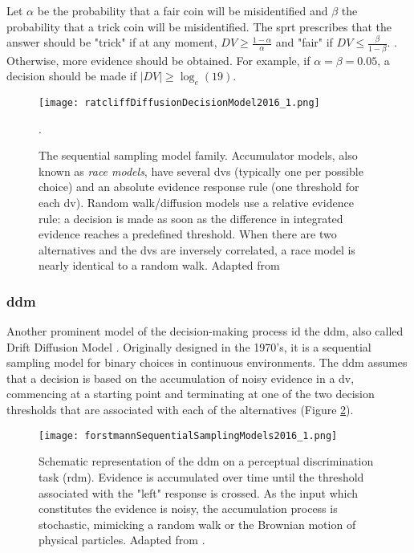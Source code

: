 Let $\alpha$ be the probability that a fair coin will be misidentified and $\beta$ the probability that a trick coin will be misidentified. The \acrshort{sprt} prescribes that the answer should be "trick" if at any moment, $DV \ge \frac{1-\alpha}{\alpha}$ and "fair" if $DV \le \frac{\beta}{1-\beta}$. . Otherwise, more evidence should be obtained. For example, if $\alpha = \beta = 0.05$, a decision should be made if $|DV| \ge \log_e(19)$.

\begin{figure}[ht]
    \centering
    \texttt{[image: ratcliffDiffusionDecisionModel2016\_1.png]}
    \caption[The sequential sampling model family]{The sequential sampling model family. Accumulator models, also known as \textit{race models}, have several \acrlong{dv}s (typically one per possible choice) and an absolute evidence response rule (one threshold for each \acrshort{dv}). Random walk/diffusion models use a relative evidence rule: a decision is made as soon as the difference in integrated evidence reaches a predefined threshold. When there are two alternatives and the \acrshort{dv}s are inversely correlated, a race model is nearly identical to a random walk. Adapted from \cite{ratcliffDiffusionDecisionModel2016}}.
    \label{figure:sequential_sampling}
\end{figure}

\subsubsection{\acrlong{ddm}}

Another prominent model of the decision-making process id the \acrfull{ddm}, also called Drift Diffusion Model \cite{ratcliffDiffusionDecisionModel2008}. Originally designed in the 1970’s, it is a sequential sampling model for binary choices in continuous environments. The \acrshort{ddm} assumes that a decision is based on the accumulation of noisy evidence in a \acrlong{dv}, commencing at a starting point and terminating at one of the two decision thresholds that are associated with each of the alternatives (Figure \ref{figure:ddm}).

\begin{figure}[ht]
    \centering
    \texttt{[image: forstmannSequentialSamplingModels2016\_1.png]}
    \caption[The \acrlong{ddm}]{Schematic representation of the \acrlong{ddm} on a perceptual discrimination task (\acrlong{rdm}). Evidence is accumulated over time until the threshold associated with the "left" response is crossed. As the input which constitutes the evidence is noisy, the accumulation process is stochastic, mimicking a random walk or the Brownian motion of physical particles. Adapted from \cite{forstmannSequentialSamplingModels2016}.}
    \label{figure:ddm}
\end{figure}

